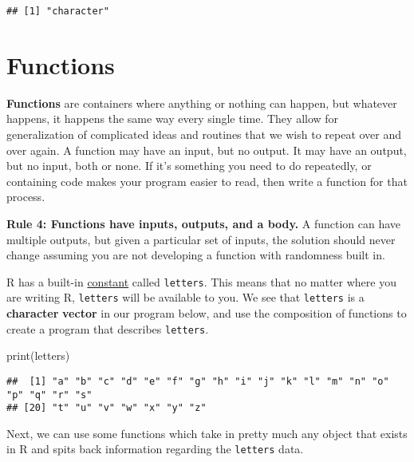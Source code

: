 \documentclass[
]{book}
\newenvironment{Shaded}{\begin{snugshade}}{\end{snugshade}}
\newcommand{\FunctionTok}[1]{\textcolor[rgb]{0.00,0.00,0.00}{#1}}
\newcommand{\NormalTok}[1]{#1}
\begin{document}
\begin{verbatim}
## [1] "character"
\end{verbatim}

\hypertarget{functions-1}{%
\section{Functions}\label{functions-1}}

\textbf{Functions} are containers where anything or nothing can happen, but whatever happens, it happens the same way every single time. They allow for generalization of complicated ideas and routines that we wish to repeat over and over again. A function may have an input, but no output. It may have an output, but no input, both or none. If it's something you need to do repeatedly, or containing code makes your program easier to read, then write a function for that process.

\textbf{Rule 4: Functions have inputs, outputs, and a body.} A function can have multiple outputs, but given a particular set of inputs, the solution should never change assuming you are not developing a function with randomness built in.

R has a built-in \href{https://stat.ethz.ch/R-manual/R-devel/library/base/html/Constants.html}{constant} called \texttt{letters}. This means that no matter where you are writing R, \texttt{letters} will be available to you. We see that \texttt{letters} is a \textbf{character} \textbf{vector} in our program below, and use the composition of functions to create a program that describes \texttt{letters}.

\begin{Shaded}
\begin{Highlighting}[]
\FunctionTok{print}\NormalTok{(letters)}
\end{Highlighting}
\end{Shaded}

\begin{verbatim}
##  [1] "a" "b" "c" "d" "e" "f" "g" "h" "i" "j" "k" "l" "m" "n" "o" "p" "q" "r" "s"
## [20] "t" "u" "v" "w" "x" "y" "z"
\end{verbatim}

Next, we can use some functions which take in pretty much any object that exists in R and spits back information regarding the \texttt{letters} data.
\end{document}
